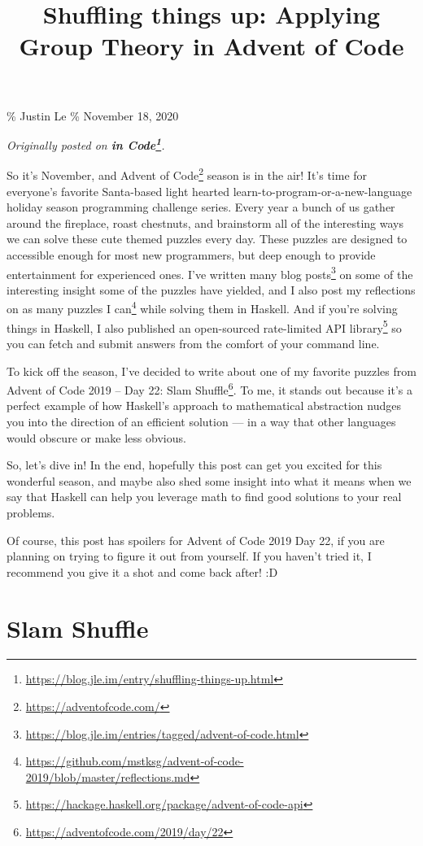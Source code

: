 \documentclass[]{article}
\title{Shuffling things up: Applying Group Theory in Advent of Code}
\renewcommand{\href}[2]{#2\footnote{\url{#1}}}
\begin{document}
\maketitle

\% Justin Le \% November 18, 2020

\emph{Originally posted on
\textbf{\href{https://blog.jle.im/entry/shuffling-things-up.html}{in Code}}.}

So it's November, and \href{https://adventofcode.com/}{Advent of Code} season is
in the air! It's time for everyone's favorite Santa-based light hearted
learn-to-program-or-a-new-language holiday season programming challenge series.
Every year a bunch of us gather around the fireplace, roast chestnuts, and
brainstorm all of the interesting ways we can solve these cute themed puzzles
every day. These puzzles are designed to accessible enough for most new
programmers, but deep enough to provide entertainment for experienced ones. I've
\href{https://blog.jle.im/entries/tagged/advent-of-code.html}{written many blog
posts} on some of the interesting insight some of the puzzles have yielded, and
I also
\href{https://github.com/mstksg/advent-of-code-2019/blob/master/reflections.md}{post
my reflections on as many puzzles I can} while solving them in Haskell. And if
you're solving things in Haskell, I also published an
\href{https://hackage.haskell.org/package/advent-of-code-api}{open-sourced
rate-limited API library} so you can fetch and submit answers from the comfort
of your command line.

To kick off the season, I've decided to write about one of my favorite puzzles
from Advent of Code 2019 -- \href{https://adventofcode.com/2019/day/22}{Day 22:
Slam Shuffle}. To me, it stands out because it's a perfect example of how
Haskell's approach to mathematical abstraction nudges you into the direction of
an efficient solution --- in a way that other languages would obscure or make
less obvious.

So, let's dive in! In the end, hopefully this post can get you excited for this
wonderful season, and maybe also shed some insight into what it means when we
say that Haskell can help you leverage math to find good solutions to your real
problems.

Of course, this post has spoilers for Advent of Code 2019 Day 22, if you are
planning on trying to figure it out from yourself. If you haven't tried it, I
recommend you give it a shot and come back after! :D

\section{Slam Shuffle}\label{slam-shuffle}
\end{document}
